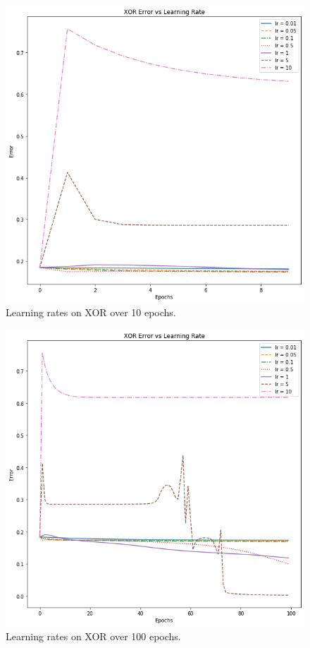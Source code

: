 \documentclass[12pt]{article}
\begin{document}
\begin{figure}
  \centering
  \includegraphics[width=\linewidth]{xor_10.png}
  \caption{Learning rates on XOR over 10 epochs.}
  \label{fig:xor10}
\end{figure}

\begin{figure}
  \centering
  \includegraphics[width=\linewidth]{xor_100.png}
  \caption{Learning rates on XOR over 100 epochs.}
  \label{fig:xor100}
\end{figure}
\end{document}
